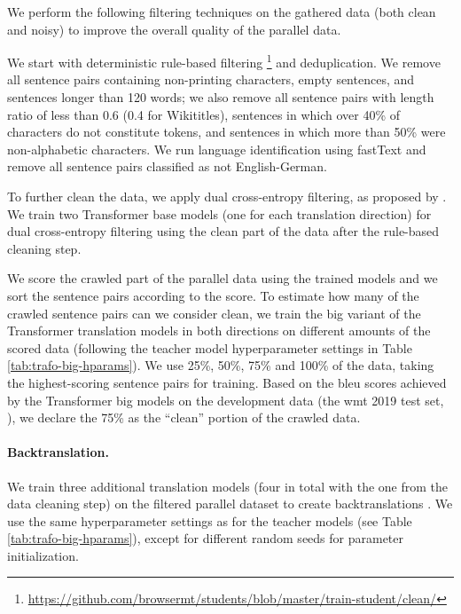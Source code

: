 We perform the following filtering techniques on the gathered data (both clean
and noisy) to improve the overall quality of the parallel data.

We start with deterministic rule-based filtering%
\footnote{\url{https://github.com/browsermt/students/blob/master/train-student/clean/}}
and deduplication. We remove all sentence pairs containing non-printing
characters, empty sentences, and sentences longer than 120 words; we also
remove all sentence pairs with length ratio of less than 0.6 (0.4 for
Wikititles), sentences in which over 40\% of characters do not constitute
tokens, and sentences in which more than 50\% were non-alphabetic characters. We
run language identification using fastText
\citep{joulin-etal-2017-bag,joulin2016fasttext} and remove all sentence pairs
classified as not English-German.

To further clean the data, we apply dual cross-entropy filtering, as proposed
by \citet{junczys-dowmunt-2018-dual}. We train two Transformer base models (one
for each translation direction) for dual cross-entropy filtering using the
clean part of the data after the rule-based cleaning step.

We score the crawled part of the parallel data using the trained models and we
sort the sentence pairs according to the score. To estimate how many of the
crawled sentence pairs can we consider clean, we train the big variant of the
Transformer translation models in both directions on different amounts of the
scored data (following the teacher model hyperparameter settings in Table
\ref{tab:trafo-big-hparams}). We use 25\%, 50\%, 75\% and 100\% of the data,
taking the highest-scoring sentence pairs for training. Based on the \acs{bleu}
scores achieved by the Transformer big models on the development data (the
\ac{wmt} 2019 test set, \citealp{barrault-etal-2019-findings}), we declare the
75\% as the ``clean'' portion of the crawled data.


\paragraph{Backtranslation.} We train three additional translation models (four
in total with the one from the data cleaning step) on the filtered parallel
dataset to create backtranslations \citep{sennrich-etal-2016-improving}. We use
the same hyperparameter settings as for the teacher models (see Table
\ref{tab:trafo-big-hparams}), except for different random seeds for parameter
initialization.

